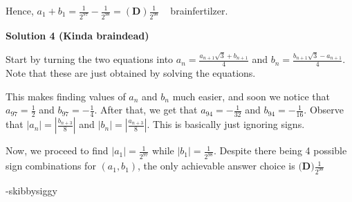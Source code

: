 \begin{enumerate}
 Hence, $a_1 + b_1 = \frac{1}{2^{97}} - \frac{1}{2^{98}} = \boxed{\mathbf{(D)}\frac{1}{2^{98}}}$ ~ brainfertilzer.

 


 



\textbf{Solution 4 (Kinda braindead)}

Start by turning the two equations into $a_n = \frac{a_{n+1}\sqrt{3}+b_{n+1}}{4}$ and $b_n = \frac{b_{n+1}\sqrt{3}-a_{n+1}}{4}$. Note that these are just obtained by solving the equations. 

 
This makes finding values of $a_n$ and $b_n$ much easier, and soon we notice that $a_{97} = \frac{1}{2}$ and $b_{97} = -\frac{1}{4}$. After that, we get that $a_{94} = -\frac{1}{32}$ and $b_{94} = -\frac{1}{16}$. Observe that $|a_n| = |\frac{b_{n+3}}{8}|$ and $|b_n| = |\frac{a_{n+3}}{8}|$. This is basically just ignoring signs.

 
Now, we proceed to find $|a_1| = \frac{1}{2^{97}}$ while $|b_1| = \frac{1}{2^{98}}$. Despite there being 4 possible sign combinations for $(a_1, b_1)$, the only achievable answer choice is $\boxed{\textbf{(D)}\frac{1}{2^{98}}}$

 
-skibbysiggy

 


 


\end{enumerate}